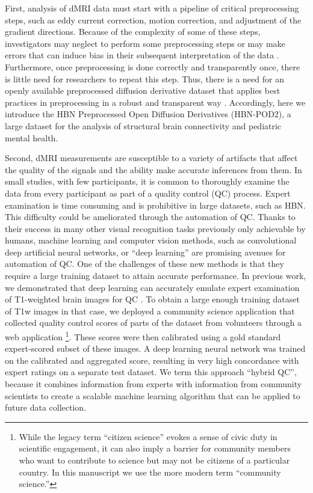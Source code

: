 \documentclass[fleqn,10pt]{wlscirep}
\begin{document}
First, analysis of dMRI data must start with a pipeline of critical
preprocessing steps, such as eddy current correction, motion correction, and
adjustment of the gradient directions. Because of the complexity of some of
these steps, investigators may neglect to perform some preprocessing steps or
may make errors that can induce bias in their subsequent interpretation of the
data \cite{jones2010-ps}. Furthermore, once preprocessing is done correctly and
transparently once, there is little need for researchers to repeat this step.
Thus, there is a need for an openly available preprocessed diffusion derivative
dataset that applies best practices in preprocessing in a robust and transparent
way \cite{cieslak2021-iq}. Accordingly, here we introduce the HBN Preprocessed
Open Diffusion Derivatives (HBN-POD2), a large dataset for the analysis of
structural brain connectivity and pediatric mental health.

Second, dMRI measurements are susceptible to a variety of artifacts that affect
the quality of the signals and the ability make accurate inferences from them.
In small studies, with few participants, it is common to thoroughly examine the
data from every participant as part of a quality control (QC) process. Expert
examination is time consuming and is prohibitive in large datasets, such as HBN.
This difficulty could be ameliorated through the automation of QC. Thanks to
their success in many other visual recognition tasks previously only achievable
by humans, machine learning and computer vision methods, such as convolutional
deep artificial neural networks, or ``deep learning'' \cite{lecun2015deep}
are promising avenues for automation of QC. One
of the challenges of these new methods is that they require a large training
dataset to attain accurate performance. In previous work, we demonstrated that
deep learning can accurately emulate expert examination of T1-weighted brain
images for QC \cite{keshavan2019-er}. To obtain a large enough training dataset of
T1w images in that case, we deployed a community science application that
collected quality control scores of parts of the dataset from volunteers through
a web application \footnote{%
    While the legacy term ``citizen science'' evokes a sense of civic duty in
    scientific engagement, it can also imply a barrier for community members who
    want to contribute to science but may not be citizens of a particular
    country.  In this manuscript we use the more modern term ``community
    science.''
}.
These scores were then calibrated using a gold standard expert-scored subset of
these images. A deep learning neural network was trained on the calibrated and
aggregated score, resulting in very high concordance with expert ratings on a
separate test dataset. We term this approach ``hybrid QC'', because it combines
information from experts with information from community scientists to create a
scalable machine learning algorithm that can be applied to future data
collection.
\end{document}
